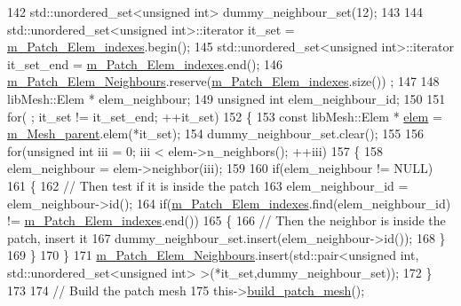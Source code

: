 \begin{DoxyCode}
142     std::unordered\_set<unsigned int> dummy\_neighbour\_set(12);
143 
144     std::unordered\_set<unsigned int>::iterator it\_set = \hyperlink{classcarl_1_1_patch__construction_af7db498027d46bff8464757e824404fb}{m\_Patch\_Elem\_indexes}.begin();
145     std::unordered\_set<unsigned int>::iterator it\_set\_end = \hyperlink{classcarl_1_1_patch__construction_af7db498027d46bff8464757e824404fb}{m\_Patch\_Elem\_indexes}.end();
146     \hyperlink{classcarl_1_1_patch__construction_a47c4343835537781c48813feed01e60e}{m\_Patch\_Elem\_Neighbours}.reserve(\hyperlink{classcarl_1_1_patch__construction_af7db498027d46bff8464757e824404fb}{m\_Patch\_Elem\_indexes}.size())
      ;
147 
148     libMesh::Elem * elem\_neighbour;
149     \textcolor{keywordtype}{unsigned} \textcolor{keywordtype}{int} elem\_neighbour\_id;
150 
151     \textcolor{keywordflow}{for}( ; it\_set != it\_set\_end; ++it\_set)
152     \{
153         \textcolor{keyword}{const} libMesh::Elem     * \hyperlink{classcarl_1_1_patch__construction_acb065fa34010bcf379156ccf8228e01c}{elem} = \hyperlink{classcarl_1_1_patch__construction_aec2f60b62d5d7b44bfcc4f9ca9de28d2}{m\_Mesh\_parent}.elem(*it\_set);
154         dummy\_neighbour\_set.clear();
155 
156         \textcolor{keywordflow}{for}(\textcolor{keywordtype}{unsigned} \textcolor{keywordtype}{int} iii = 0; iii < elem->n\_neighbors(); ++iii)
157         \{
158             elem\_neighbour = elem->neighbor(iii);
159 
160             \textcolor{keywordflow}{if}(elem\_neighbour != NULL)
161             \{
162                 \textcolor{comment}{// Then test if it is inside the patch}
163                 elem\_neighbour\_id = elem\_neighbour->id();
164                 \textcolor{keywordflow}{if}(\hyperlink{classcarl_1_1_patch__construction_af7db498027d46bff8464757e824404fb}{m\_Patch\_Elem\_indexes}.find(elem\_neighbour\_id) != 
      \hyperlink{classcarl_1_1_patch__construction_af7db498027d46bff8464757e824404fb}{m\_Patch\_Elem\_indexes}.end())
165                 \{
166                     \textcolor{comment}{// Then the neighbor is inside the patch, insert it}
167                     dummy\_neighbour\_set.insert(elem\_neighbour->id());
168                 \}
169             \}
170         \}
171         \hyperlink{classcarl_1_1_patch__construction_a47c4343835537781c48813feed01e60e}{m\_Patch\_Elem\_Neighbours}.insert(std::pair<\textcolor{keywordtype}{unsigned} \textcolor{keywordtype}{int},
      std::unordered\_set<unsigned int> >(*it\_set,dummy\_neighbour\_set));
172     \}
173 
174     \textcolor{comment}{// Build the patch mesh}
175     this->\hyperlink{classcarl_1_1_patch__construction_ab4e5b3f8e8f2a7c0af44979a8b0a39c4}{build\_patch\_mesh}();

\end{DoxyCode}
